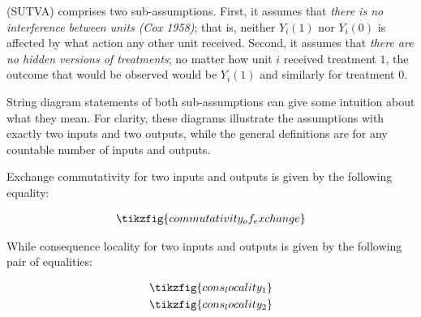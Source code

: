 \begin{blockquote}
(SUTVA) comprises two sub-assumptions. First, it assumes that \emph{there is no interference between units (Cox 1958)}; that is, neither $Y_i(1)$ nor $Y_i(0)$ is affected by what action any other unit received. Second, it assumes that \emph{there are no hidden versions of treatments}; no matter how unit $i$ received treatment $1$, the outcome that would be observed would be $Y_i(1)$ and similarly for treatment $0$.
\end{blockquote}

String diagram statements of both sub-assumptions can give some intuition about what they mean. For clarity, these diagrams illustrate the assumptions with exactly two inputs and two outputs, while the general definitions are for any countable number of inputs and outputs.

Exchange commutativity for two inputs and outputs is given by the following equality:

\begin{align}
    \tikzfig{commutativity_of_exchange}
\end{align}

While consequence locality for two inputs and outputs is given by the following pair of equalities:

\begin{align}
    \tikzfig{cons_locality_1}\\
    \tikzfig{cons_locality_2}
\end{align}






